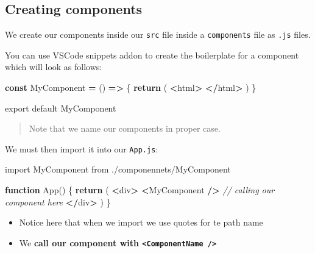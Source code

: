 \documentclass[
]{report}
\newenvironment{Shaded}{\begin{snugshade}}{\end{snugshade}}
\newcommand{\CommentTok}[1]{\textcolor[rgb]{0.56,0.35,0.01}{\textit{#1}}}
\newcommand{\ControlFlowTok}[1]{\textcolor[rgb]{0.13,0.29,0.53}{\textbf{#1}}}
\newcommand{\FunctionTok}[1]{\textcolor[rgb]{0.00,0.00,0.00}{#1}}
\newcommand{\ImportTok}[1]{#1}
\newcommand{\KeywordTok}[1]{\textcolor[rgb]{0.13,0.29,0.53}{\textbf{#1}}}
\newcommand{\NormalTok}[1]{#1}
\newcommand{\OperatorTok}[1]{\textcolor[rgb]{0.81,0.36,0.00}{\textbf{#1}}}
\newcommand{\StringTok}[1]{\textcolor[rgb]{0.31,0.60,0.02}{#1}}
\providecommand{\tightlist}{%
  \setlength{\itemsep}{0pt}\setlength{\parskip}{0pt}}
\begin{document}
\hypertarget{creating-components}{%
\subsection{Creating components}\label{creating-components}}

We create our components inside our \texttt{src} file inside a \texttt{components} file as \texttt{.js} files.

You can use VSCode snippets addon to create the boilerplate for a component which will look as follows:

\begin{Shaded}
\begin{Highlighting}[]
\KeywordTok{const}\NormalTok{ MyComponent }\OperatorTok{=}\NormalTok{ () }\KeywordTok{=\textgreater{}}\NormalTok{ \{}
    \ControlFlowTok{return}\NormalTok{ (}
        \OperatorTok{\textless{}}\NormalTok{html}\OperatorTok{\textgreater{}}
        \OperatorTok{\textless{}/}\NormalTok{html}\OperatorTok{\textgreater{}} 
\NormalTok{    )}
\NormalTok{\}}

\ImportTok{export} \ImportTok{default}\NormalTok{ MyComponent}
\end{Highlighting}
\end{Shaded}

\begin{quote}
Note that we name our components in proper case.
\end{quote}

We must then import it into our \texttt{App.js}:

\begin{Shaded}
\begin{Highlighting}[]
\ImportTok{import}\NormalTok{ MyComponent }\ImportTok{from} \StringTok{\textquotesingle{}./componennets/MyComponent\textquotesingle{}}

\KeywordTok{function} \FunctionTok{App}\NormalTok{() \{}
    \ControlFlowTok{return}\NormalTok{ (}
        \OperatorTok{\textless{}}\NormalTok{div}\OperatorTok{\textgreater{}}
            \OperatorTok{\textless{}}\NormalTok{MyComponent }\OperatorTok{/\textgreater{}} \CommentTok{// calling our component here}
        \OperatorTok{\textless{}/}\NormalTok{div}\OperatorTok{\textgreater{}}
\NormalTok{    )}
\NormalTok{\}}
\end{Highlighting}
\end{Shaded}

\begin{itemize}
\tightlist
\item
  Notice here that when we import we use quotes for te path name
\item
  We \textbf{call our component with \texttt{\textless{}ComponentName\ /\textgreater{}}}
\end{itemize}
\end{document}
